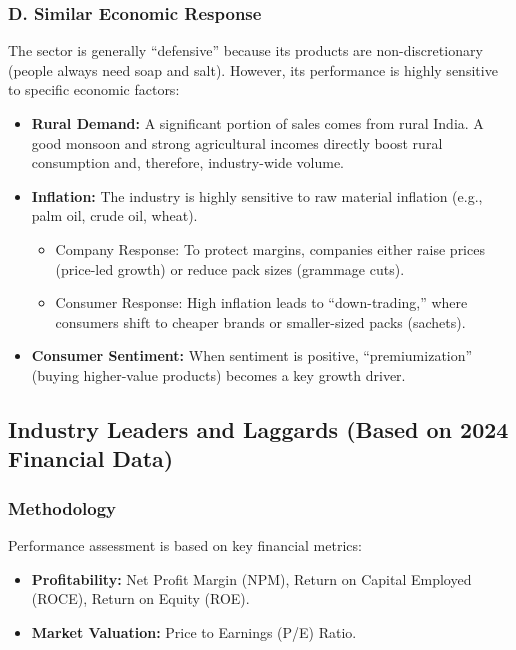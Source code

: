 \documentclass[12pt, a4paper]{report}
\begin{document}
\subsubsection*{D. Similar Economic Response}

The sector is generally ``defensive'' because its products are non-discretionary (people always need soap and salt). However, its performance is highly sensitive to specific economic factors:

\begin{itemize}
    \item \textbf{Rural Demand:} A significant portion of sales comes from rural India. A good monsoon and strong agricultural incomes directly boost rural consumption and, therefore, industry-wide volume.
    
    \item \textbf{Inflation:} The industry is highly sensitive to raw material inflation (e.g., palm oil, crude oil, wheat).
    \begin{itemize}
        \item Company Response: To protect margins, companies either raise prices (price-led growth) or reduce pack sizes (grammage cuts).
        \item Consumer Response: High inflation leads to ``down-trading,'' where consumers shift to cheaper brands or smaller-sized packs (sachets).
    \end{itemize}
    
    \item \textbf{Consumer Sentiment:} When sentiment is positive, ``premiumization'' (buying higher-value products) becomes a key growth driver.
\end{itemize}

\subsection{Industry Leaders and Laggards (Based on 2024 Financial Data)}

\subsubsection*{Methodology}

Performance assessment is based on key financial metrics:

\begin{itemize}
    \item \textbf{Profitability:} Net Profit Margin (NPM), Return on Capital Employed (ROCE), Return on Equity (ROE).
    \item \textbf{Market Valuation:} Price to Earnings (P/E) Ratio.
\end{itemize}
\end{document}
